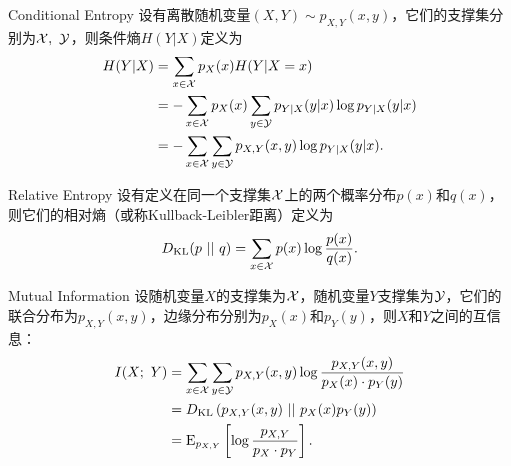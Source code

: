 \begin{definition}{Conditional Entropy}
	设有离散随机变量$(X,Y) \sim p_{X,Y}(x,y)$，它们的支撑集分别为$\mathcal{X}, ~\mathcal{Y}$，则条件熵$H(Y|X)$定义为
	\begin{equation}
		\begin{split}
			H(Y|X) &= \sum_{x\in\mathcal{X}} p_X(x) H(Y|X=x) \\
					&= -\sum_{x\in\mathcal{X}} p_X(x) 
							\sum_{y\in\mathcal{Y}} p_{Y|X}(y|x) \log p_{Y|X}(y|x) \\
					&= -\sum_{x\in\mathcal{X}}\sum_{y\in\mathcal{Y}}
						p_{X,Y}(x,y) \log p_{Y|X}(y|x).
		\end{split}
	\end{equation}
\end{definition}

\begin{definition}{Relative Entropy}
  设有定义在同一个支撑集$\mathcal{X}$上的两个概率分布$p(x)$和$q(x)$，则它们的相对熵（或称Kullback-Leibler距离）定义为
  \begin{equation}
    D_{\text{KL}}(p~||~q) = \sum_{x\in\mathcal{X}} p(x)\log \frac{p(x)}{q(x)}.
  \end{equation}
  \label{def:relative-entropy}
\end{definition}

\begin{definition}{Mutual Information}
  设随机变量$X$的支撑集为$\mathcal{X}$，随机变量$Y$支撑集为$\mathcal{Y}$，它们的联合分布为$p_{X,Y}(x, y)$，边缘分布分别为$p_X(x)$和$p_Y(y)$，则$X$和$Y$之间的互信息：
  \begin{equation}
    \begin{split}
      I(X;~Y) &= \sum_{x\in\mathcal{X}}\sum_{y\in\mathcal{Y}} 
      p_{X,Y}(x,y) \log\frac{p_{X,Y}(x,y)}{p_X(x) \cdot p_Y(y)}  \\
            &= D_{\text{KL}}\left( p_{X,Y}(x,y)~||~p_X(x) p_Y(y) \right) \\
            &= \text{E}_{p_{X,Y}} \left[ 
              \log\frac{p_{X,Y}}{p_X \cdot p_Y}
              \right].
    \end{split}
    \label{eq:mutual-information}
  \end{equation}
  \label{def:mutual-information}
\end{definition}

